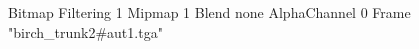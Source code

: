 {Bitmap
	{Filtering 1}
	{Mipmap 1}
	{Blend none}
	{AlphaChannel 0}
	{Frame "birch_trunk2#aut1.tga"}
}
